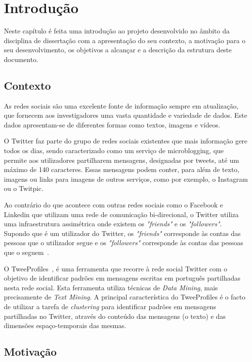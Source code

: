 \chapter{Introdução} \label{chap:intro}

Neste capítulo é feita uma introdução ao projeto desenvolvido no âmbito da disciplina de dissertação com a apresentação do seu contexto, a motivação para o seu desenvolvimento, os objetivos a alcançar e a descrição da estrutura deste documento.

\section{Contexto}

As redes sociais são uma excelente fonte de informação sempre em atualização, que fornecem aos investigadores uma vasta quantidade e variedade de dados. Este dados apresentam-se de diferentes formas como textos, imagens e vídeos. 

O Twitter faz parte do grupo de redes sociais existentes que mais informação gere todos os dias, sendo caracterizado como um serviço de microblogging, que permite aos utilizadores partilharem mensagens, designadas por tweets, até um máximo de 140 caracteres. Essas mensagens podem conter, para além de texto, imagens ou links para imagens de outros serviços, como por exemplo, o Instagram ou o Twitpic.

Ao contrário do que acontece com outras redes sociais como o Facebook e Linkedin que utilizam uma rede de comunicação bi-direcional, o Twitter utiliza uma infraestrutura assimétrica onde existem os \textit{"friends"} e os \textit{"followers"}. Supondo que é um utilizador do Twitter, os \textit{"friends"} corresponde às contas das pessoas que o utilizador segue e os \textit{"followers"} corresponde às contas das pessoas que o seguem~\citet{Russell2011}.

O TweeProfiles~\citet{Cunha2013}, é uma ferramenta que recorre à rede social Twitter com o objetivo de identificar padrões em mensagens escritas em português partilhadas nesta rede social. Esta ferramenta utiliza técnicas de \textit{Data Mining}, mais precisamente de \textit{Text Mining}. A principal característica do TweeProfiles é o facto de utilizar a tarefa de \textit{clustering} para identificar padrões em mensagens partilhadas no Twitter, através do conteúdo das mensagens (o texto) e das dimensões espaço-temporais das mesmas. 

\section{Motivação} \label{sec:motiv}

